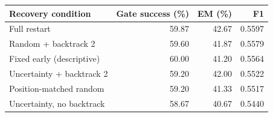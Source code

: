 \begin{tabular}{@{}lrrr@{}}
\toprule
Recovery condition & Gate success (\%) & EM (\%) & F1 \\
\midrule
Full restart & 59.87 & 42.67 & 0.5597 \\
Random + backtrack 2 & 59.60 & 41.87 & 0.5579 \\
Fixed early (descriptive) & 60.00 & 41.20 & 0.5564 \\
Uncertainty + backtrack 2 & 59.20 & 42.00 & 0.5522 \\
Position-matched random & 59.20 & 41.33 & 0.5517 \\
Uncertainty, no backtrack & 58.67 & 40.67 & 0.5440 \\
\bottomrule
\end{tabular}
